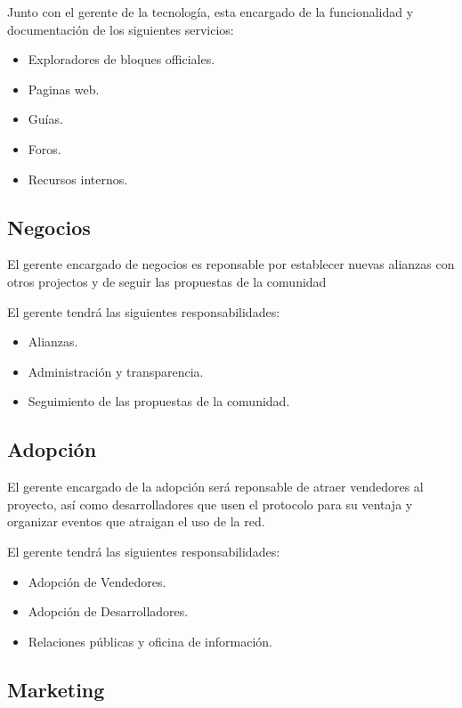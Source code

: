 \documentclass{article}
\begin{document}
Junto con el gerente de la tecnología, esta encargado de la funcionalidad y documentación de los siguientes servicios:

\begin{itemize}
  \item Exploradores de bloques officiales.
  \item Paginas web.
  \item Guías.
  \item Foros.
  \item Recursos internos.
\end{itemize}


\subsection{Negocios}

El gerente encargado de negocios es reponsable por establecer nuevas alianzas con otros projectos y de seguir las propuestas de la comunidad

El gerente tendrá las siguientes responsabilidades:

\begin{itemize}
  \item Alianzas.
  \item Administración y transparencia.
  \item Seguimiento de las propuestas de la comunidad.
\end{itemize}

\subsection{Adopción}

El gerente encargado de la adopción será reponsable de atraer vendedores al proyecto, así como desarrolladores que usen el protocolo para su ventaja y organizar eventos que atraigan el uso de la red.

El gerente tendrá las siguientes responsabilidades:

\begin{itemize}
  \item Adopción de Vendedores.
  \item Adopción de Desarrolladores.
  \item Relaciones públicas y oficina de información.
\end{itemize}

\subsection{Marketing}
\end{document}
